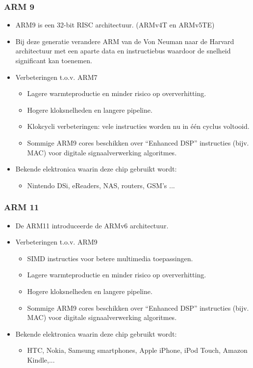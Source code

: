 \documentclass{beamer}
\begin{document}
\begin{frame} 
\frametitle{ARM 9}
  \begin{itemize}
  \item <1-> ARM9 is een 32-bit RISC architectuur. (ARMv4T en ARMv5TE)
  \item <2-> Bij deze generatie verandere ARM van de Von Neuman naar de Harvard architectuur met een aparte data en instructiebus waardoor de snelheid significant kan toenemen.
  \item <3-> Verbeteringen t.o.v. ARM7
      \begin{itemize}
      \item <4-> Lagere warmteproductie en minder risico op oververhitting.
      \item <5-> Hogere kloksnelheden en langere pipeline.
      \item <6-> Klokcycli verbeteringen: vele instructies worden nu in \'e\'en cyclus voltooid.
      \item <7-> Sommige ARM9 cores beschikken over ``Enhanced DSP'' instructies (bijv. MAC) voor digitale signaalverwerking algoritmes.
      \end{itemize}
  \item <8-> Bekende elektronica waarin deze chip gebruikt wordt:
      \begin{itemize}
      \item Nintendo DSi, eReaders, NAS, routers, GSM's ...
      \end{itemize}
  \end{itemize}
\end{frame}

\begin{frame} 
\frametitle{ARM 11}
  \begin{itemize}
  \item <1-> De ARM11 introduceerde de ARMv6 architectuur.
  \item <2-> Verbeteringen t.o.v. ARM9
	\begin{itemize}
	\item <3-> SIMD instructies voor betere multimedia toepassingen.
	\item <4-> Lagere warmteproductie en minder risico op oververhitting.
	\item <5-> Hogere kloksnelheden en langere pipeline.
	\item <6-> Sommige ARM9 cores beschikken over ``Enhanced DSP'' instructies (bijv. MAC) voor digitale signaalverwerking algoritmes.
	\end{itemize}
  \item <7-> Bekende elektronica waarin deze chip gebruikt wordt:
	\begin{itemize}
	\item HTC, Nokia, Samsung smartphones, Apple iPhone, iPod Touch, Amazon Kindle,...
	\end{itemize}
  \end{itemize}
\end{frame}
\end{document}
